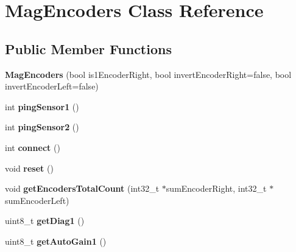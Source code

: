 \hypertarget{classMagEncoders}{}\section{Mag\+Encoders Class Reference}
\label{classMagEncoders}
\subsection*{Public Member Functions}
\begin{DoxyCompactItemize}
\item 
\mbox{\label{classMagEncoders_a3b2cc4f301a4acb680486c6415272487}} 
{\bfseries Mag\+Encoders} (bool is1\+Encoder\+Right, bool invert\+Encoder\+Right=false, bool invert\+Encoder\+Left=false)
\item 
\mbox{\label{classMagEncoders_abd1472af85898ab6b7e8e0b06607b656}} 
int {\bfseries ping\+Sensor1} ()
\item 
\mbox{\label{classMagEncoders_ac031380456cc1732f78ca2abd8b80d29}} 
int {\bfseries ping\+Sensor2} ()
\item 
\mbox{\label{classMagEncoders_a6fd12708f1cb7e8015dfd8b9d857ba4c}} 
int {\bfseries connect} ()
\item 
\mbox{\label{classMagEncoders_a791a795257fa39142871402a7370d9d6}} 
void {\bfseries reset} ()
\item 
\mbox{\label{classMagEncoders_afcfd0839a7e9d4cfcdfc9ca9cb0c244c}} 
void {\bfseries get\+Encoders\+Total\+Count} (int32\+\_\+t $\ast$sum\+Encoder\+Right, int32\+\_\+t $\ast$sum\+Encoder\+Left)
\item 
\mbox{\label{classMagEncoders_a58a3bab6058c65664c814aecc7e75e52}} 
uint8\+\_\+t {\bfseries get\+Diag1} ()
\item 
\mbox{\label{classMagEncoders_afaae32e273d632c64206e71627feb462}} 
uint8\+\_\+t {\bfseries get\+Auto\+Gain1} ()
\item 
\mbox{\label{classMagEncoders_a4f97edaf61f85cb28430969dc16d4db0}} 

\end{DoxyCompactItemize}
